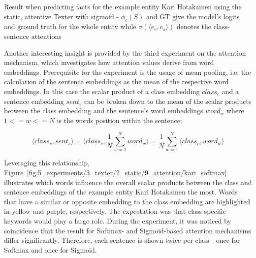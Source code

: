 \begin{table}[h]
    \centering
    
    \caption{Result when predicting facts for the example entity Kari Hotakainen using the static, attentive Texter with sigmoid - $\phi_c(S)$ and GT give the model's logits and ground truth for the whole entity while $\sigma(\langle e_c, e_s \rangle)$ denotes the class-sentence attentions}
    \label{tab:5_experiments/3_texter/2_static/9_attention/kari}
\end{table}

Another interesting insight is provided by the third experiment on the attention mechanism, which investigates how attention values derive from word embeddings. Prerequisite for the experiment is the usage of mean pooling, i.e. the calculation of the sentence embeddings as the mean of the respective word embeddings. In this case the scalar product of a class embedding $class_c$ and a sentence embedding $sent_s$ can be broken down to the mean of the scalar products between the class embedding and the sentence's word embeddings $word_w$ where $1 <= w <= N$ is the words position within the sentence:

\[
    \langle class_c, sent_s \rangle
    = \langle class_c, \frac{1}{N} \sum_{w=1}^N word_w \rangle
    = \frac{1}{N} \sum_{w=1}^N \langle class_c, word_w \rangle
\]

Leveraging this relationship, Figure~\ref{fig:5_experiments/3_texter/2_static/9_attention/kari_softmax} illustrates which words influence the overall scalar products between the class and sentence embeddings of the example entity Kari Hotakainen the most. Words that have a similar or opposite embedding to the class embedding are highlighted in yellow and purple, respectively. The expectation was that class-specific keywords would play a large role. During the experiment, it was noticed by coincidence that the result for Softmax- and Sigmoid-based attention mechanisms differ significantly. Therefore, each sentence is shown twice per class - once for Softmax and once for Sigmoid.

